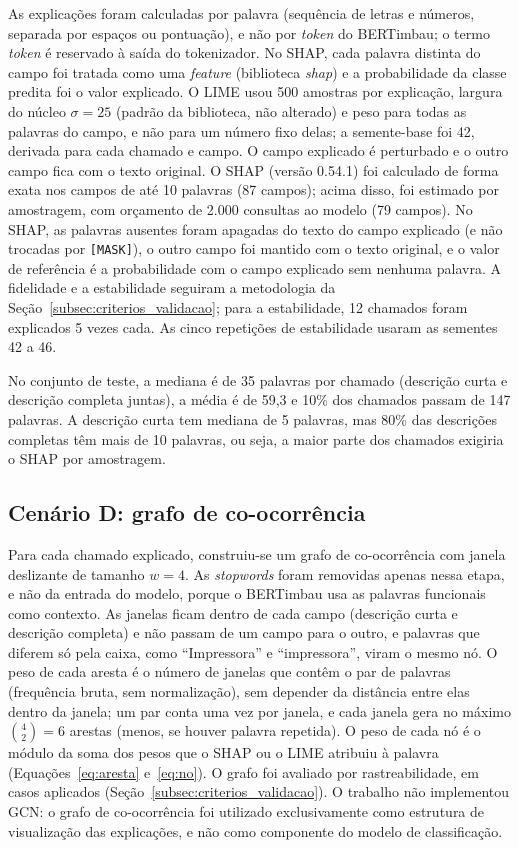 \documentclass[
    12pt,                %
    openright,           %
    oneside,             %
    a4paper,             %
    english,             %
    brazil               %
]{abntex2}
\begin{document}
As explicações foram calculadas por palavra (sequência de letras e números, separada por espaços ou pontuação), e não por \textit{token} do BERTimbau; o termo \textit{token} é reservado à saída do tokenizador. No SHAP, cada palavra distinta do campo foi tratada como uma \textit{feature} (biblioteca \textit{shap}) e a probabilidade da classe predita foi o valor explicado. O LIME usou 500 amostras por explicação, largura do núcleo $\sigma = 25$ (padrão da biblioteca, não alterado) e peso para todas as palavras do campo, e não para um número fixo delas; a semente-base foi 42, derivada para cada chamado e campo. O campo explicado é perturbado e o outro campo fica com o texto original. O SHAP (versão 0.54.1) foi calculado de forma exata nos campos de até 10 palavras (87 campos); acima disso, foi estimado por amostragem, com orçamento de 2.000 consultas ao modelo (79 campos). No SHAP, as palavras ausentes foram apagadas do texto do campo explicado (e não trocadas por \texttt{[MASK]}), o outro campo foi mantido com o texto original, e o valor de referência é a probabilidade com o campo explicado sem nenhuma palavra. A fidelidade e a estabilidade seguiram a metodologia da Seção~\ref{subsec:criterios_validacao}; para a estabilidade, 12 chamados foram explicados 5 vezes cada. As cinco repetições de estabilidade usaram as sementes 42 a 46.

No conjunto de teste, a mediana é de 35 palavras por chamado (descrição curta e descrição completa juntas), a média é de 59,3 e 10\% dos chamados passam de 147 palavras. A descrição curta tem mediana de 5 palavras, mas 80\% das descrições completas têm mais de 10 palavras, ou seja, a maior parte dos chamados exigiria o SHAP por amostragem.

\subsection{Cenário D: grafo de co-ocorrência}
\label{subsec:cenario_d}

Para cada chamado explicado, construiu-se um grafo de co-ocorrência com janela deslizante de tamanho $w = 4$. As \textit{stopwords} foram removidas apenas nessa etapa, e não da entrada do modelo, porque o BERTimbau usa as palavras funcionais como contexto. As janelas ficam dentro de cada campo (descrição curta e descrição completa) e não passam de um campo para o outro, e palavras que diferem só pela caixa, como ``Impressora'' e ``impressora'', viram o mesmo nó. O peso de cada aresta é o número de janelas que contêm o par de palavras (frequência bruta, sem normalização), sem depender da distância entre elas dentro da janela; um par conta uma vez por janela, e cada janela gera no máximo $\binom{4}{2} = 6$ arestas (menos, se houver palavra repetida). O peso de cada nó é o módulo da soma dos pesos que o SHAP ou o LIME atribuiu à palavra (Equações~\ref{eq:aresta} e~\ref{eq:no}). O grafo foi avaliado por rastreabilidade, em casos aplicados (Seção~\ref{subsec:criterios_validacao}). O trabalho não implementou GCN: o grafo de co-ocorrência foi utilizado exclusivamente como estrutura de visualização das explicações, e não como componente do modelo de classificação.
\end{document}

